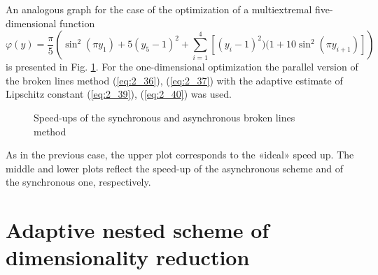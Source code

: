 An analogous graph for the case of the optimization of a multiextremal five-dimensional function
\begin{displaymath}
\varphi(y)=\frac{\pi}{5}\left(\sin^2(\pi y_1)+5(y_5-1)^2+\sum_{i=1}^4{[(y_i-1)^2)(1+10\sin^2(\pi y_{i+1})]}    \right)
\end{displaymath}
is presented in Fig. \ref{fig:5_8}. For the one-dimensional optimization the parallel version of the broken lines method (\ref{eq:2_36}), (\ref{eq:2_37}) with the adaptive estimate of Lipschitz constant (\ref{eq:2_39}), (\ref{eq:2_40}) was used.
\begin{figure}[t]
\centering
\caption{Speed-ups of the synchronous and asynchronous broken lines method}
\label{fig:5_8}    
\end{figure}

As in the previous case, the upper plot corresponds to the «ideal» speed up. The middle and lower plots reflect the speed-up of the asynchronous scheme and of the synchronous one, respectively. 
\section{Adaptive nested scheme of dimensionality reduction}
\label{sec:5_4}
